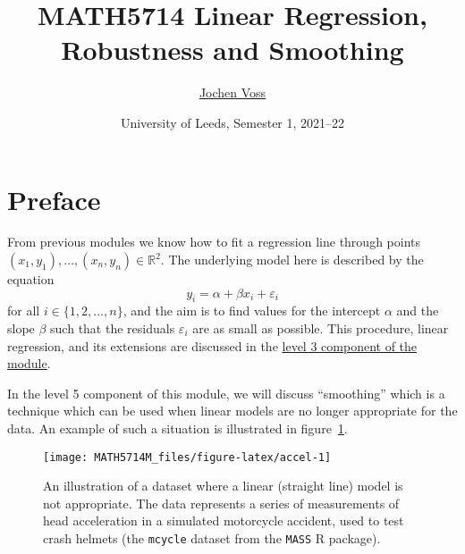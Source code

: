 \documentclass[
  a4paper,
]{article}
\title{MATH5714 Linear Regression, Robustness and Smoothing}
\author{\href{mailto:J.Voss@leeds.ac.uk}{Jochen Voss}}
\date{University of Leeds, Semester 1, 2021--22}
\theoremstyle{definition}
\theoremstyle{definition}
\theoremstyle{definition}
\theoremstyle{definition}
\theoremstyle{remark}
\begin{document}
\maketitle

{
\setcounter{tocdepth}{2}
\tableofcontents
}
\newcommand{\argmin}{\mathop{\mathrm{arg\,min}}\limits}
\newcommand{\bias}{\mathop{\mathrm{bias}}}
\newcommand{\CN}{\mathcal{N}}
\newcommand{\CU}{\mathcal{U}}
\newcommand{\downto}{\downarrow}
\newcommand{\ds}{\displaystyle}
\newcommand{\E}{\mathbb{E}}
\newcommand{\eps}{\varepsilon}
\newcommand{\MSE}{\mathop{\mathrm{MSE}}\nolimits}
\newcommand{\N}{\mathbb{N}}
\renewcommand{\phi}{\varphi}
\newcommand{\R}{\mathbb{R}}
\newcommand{\Var}{\mathop{\mathrm{Var}}}

\hypertarget{home}{%
\section*{Preface}\label{home}}

From previous modules we know how to fit a regression line through
points \((x_1, y_1), \ldots, (x_n, y_n) \in\mathbb{R}^2\). The underlying model
here is described by the equation
\begin{equation*}
  y_i
  = \alpha + \beta x_i + \varepsilon_i
\end{equation*}
for all \(i \in \{1, 2, \ldots, n\}\), and the aim is to find values for
the intercept \(\alpha\) and the slope \(\beta\) such that the residuals
\(\varepsilon_i\) are as small as possible. This procedure,
linear regression, and its extensions are discussed in the \href{https://seehuhn.github.io/MATH3714/}{level 3
component of the module}.

In the level 5 component of this module, we will discuss ``smoothing''
which is a technique which can be used when linear models are no longer
appropriate for the data. An example of such a situation is illustrated
in figure~\ref{fig:accel}.



\begin{figure}

{\centering \texttt{[image: MATH5714M\_files/figure-latex/accel-1]} 

}

\caption{An illustration of a dataset where a linear (straight line) model is not appropriate. The data represents a series of measurements of head acceleration in a simulated motorcycle accident, used to test crash helmets (the \texttt{mcycle} dataset from the \texttt{MASS} R package).}\label{fig:accel}
\end{figure}
\end{document}
